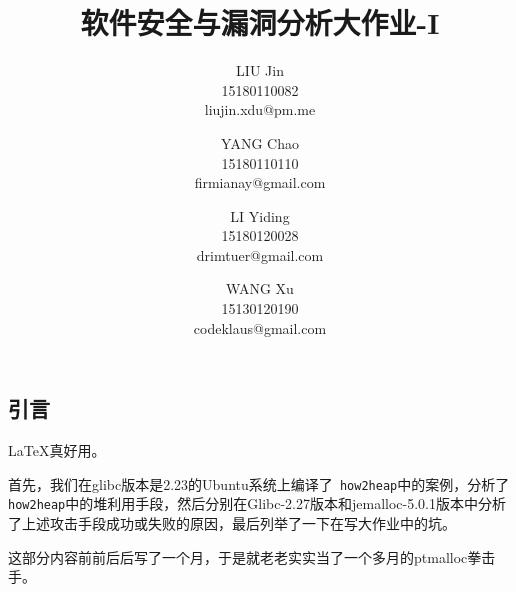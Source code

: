 \documentclass{article}
\title{软件安全与漏洞分析大作业-I}
\author{LIU Jin\\
15180110082 \\
liujin.xdu@pm.me \and
YANG Chao\\
15180110110 \\
firmianay@gmail.com \and
LI Yiding\\
15180120028 \\
drimtuer@gmail.com \and
WANG Xu\\
15130120190 \\
codeklaus@gmail.com
}
\begin{document}
\maketitle

\renewcommand{\contentsname}{目录}

\newpage
\tableofcontents
\newpage

\begin{center}
    \section{引言}
\end{center}

\setlength{\parindent}{2em}

 \LaTeX 真好用。
 
 首先，我们在glibc版本是2.23的Ubuntu系统上编译了\verb+ how2heap+中的案例，分析了\verb+ how2heap+中的堆利用手段，然后分别在Glibc-2.27版本和jemalloc-5.0.1版本中分析了上述攻击手段成功或失败的原因，最后列举了一下在写大作业中的坑。
 
 这部分内容前前后后写了一个月，于是就老老实实当了一个多月的ptmalloc拳击手。

\newpage
% 

% 



% 

% 
\end{document}
